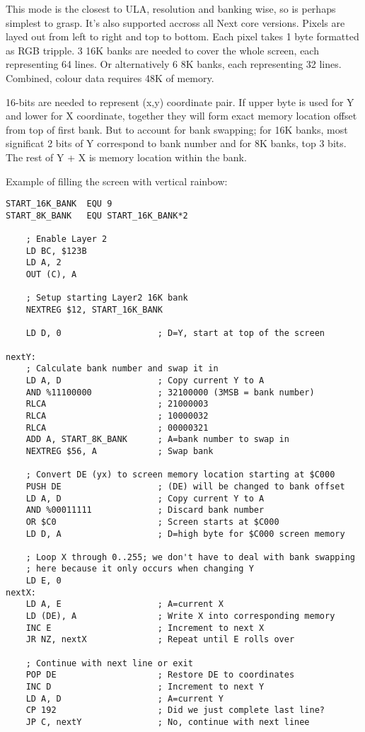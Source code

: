 \documentclass[12pt,twoside,openright,a4paper]{book}
\begin{document}
This mode is the closest to ULA, resolution and banking wise, so is perhaps simplest to grasp. It's also supported accross all Next core versions. Pixels are layed out from left to right and top to bottom. Each pixel takes 1 byte formatted as RGB tripple. 3 16K banks are needed to cover the whole screen, each representing 64 lines. Or alternatively 6 8K banks, each representing 32 lines. Combined, colour data requires 48K of memory.

16-bits are needed to represent (x,y) coordinate pair. If upper byte is used for Y and lower for X coordinate, together they will form exact memory location offset from top of first bank. But to account for bank swapping; for 16K banks, most significat 2 bits of Y correspond to bank number and for 8K banks, top 3 bits. The rest of Y + X is memory location within the bank.

Example of filling the screen with vertical rainbow:

\begin{Verbatim}
START_16K_BANK  EQU 9
START_8K_BANK   EQU START_16K_BANK*2

	; Enable Layer 2
	LD BC, $123B
	LD A, 2
	OUT (C), A
    
    ; Setup starting Layer2 16K bank
    NEXTREG $12, START_16K_BANK
    
    LD D, 0                   ; D=Y, start at top of the screen
    
nextY:
    ; Calculate bank number and swap it in
    LD A, D                   ; Copy current Y to A
    AND %11100000             ; 32100000 (3MSB = bank number)
    RLCA                      ; 21000003
    RLCA                      ; 10000032
    RLCA                      ; 00000321
    ADD A, START_8K_BANK      ; A=bank number to swap in
    NEXTREG $56, A            ; Swap bank
    
    ; Convert DE (yx) to screen memory location starting at $C000
    PUSH DE                   ; (DE) will be changed to bank offset
    LD A, D                   ; Copy current Y to A
    AND %00011111             ; Discard bank number
    OR $C0                    ; Screen starts at $C000
    LD D, A                   ; D=high byte for $C000 screen memory

    ; Loop X through 0..255; we don't have to deal with bank swapping
    ; here because it only occurs when changing Y
    LD E, 0
nextX:
    LD A, E                   ; A=current X
    LD (DE), A                ; Write X into corresponding memory
    INC E                     ; Increment to next X
    JR NZ, nextX              ; Repeat until E rolls over
    
    ; Continue with next line or exit
    POP DE                    ; Restore DE to coordinates
    INC D                     ; Increment to next Y
    LD A, D                   ; A=current Y
    CP 192                    ; Did we just complete last line?
    JP C, nextY               ; No, continue with next linee
\end{Verbatim}
\end{document}
